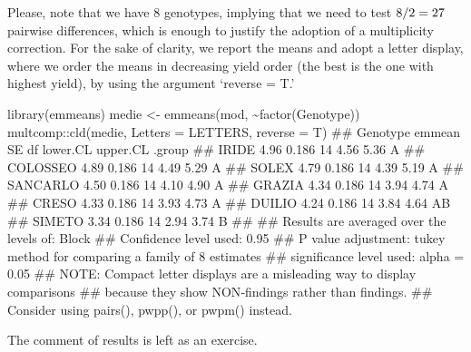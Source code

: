 \documentclass[a4paper,12pt,oneside]{book}
\newenvironment{Shaded}{\begin{snugshade}}{\end{snugshade}}
\newcommand{\SpecialCharTok}[1]{#1}
\newcommand{\DocumentationTok}[1]{#1}
\newcommand{\OtherTok}[1]{#1}
\newcommand{\FunctionTok}[1]{#1}
\newcommand{\AttributeTok}[1]{#1}
\newcommand{\AlertTok}[1]{#1}
\newcommand{\NormalTok}[1]{#1}
\begin{document}
Please, note that we have 8 genotypes, implying that we need to test \(8 \time 7 / 2 = 27\) pairwise differences, which is enough to justify the adoption of a multiplicity correction. For the sake of clarity, we report the means and adopt a letter display, where we order the means in decreasing yield order (the best is the one with highest yield), by using the argument `reverse = T.'

\scriptsize

\begin{Shaded}
\begin{Highlighting}[]
\FunctionTok{library}\NormalTok{(emmeans)}
\NormalTok{medie }\OtherTok{\textless{}{-}} \FunctionTok{emmeans}\NormalTok{(mod, }\SpecialCharTok{\textasciitilde{}}\FunctionTok{factor}\NormalTok{(Genotype))}
\NormalTok{multcomp}\SpecialCharTok{::}\FunctionTok{cld}\NormalTok{(medie, }\AttributeTok{Letters =}\NormalTok{ LETTERS, }\AttributeTok{reverse =}\NormalTok{ T)}
\DocumentationTok{\#\#  Genotype emmean    SE df lower.CL upper.CL .group}
\DocumentationTok{\#\#  IRIDE      4.96 0.186 14     4.56     5.36  A    }
\DocumentationTok{\#\#  COLOSSEO   4.89 0.186 14     4.49     5.29  A    }
\DocumentationTok{\#\#  SOLEX      4.79 0.186 14     4.39     5.19  A    }
\DocumentationTok{\#\#  SANCARLO   4.50 0.186 14     4.10     4.90  A    }
\DocumentationTok{\#\#  GRAZIA     4.34 0.186 14     3.94     4.74  A    }
\DocumentationTok{\#\#  CRESO      4.33 0.186 14     3.93     4.73  A    }
\DocumentationTok{\#\#  DUILIO     4.24 0.186 14     3.84     4.64  AB   }
\DocumentationTok{\#\#  SIMETO     3.34 0.186 14     2.94     3.74   B   }
\DocumentationTok{\#\# }
\DocumentationTok{\#\# Results are averaged over the levels of: Block }
\DocumentationTok{\#\# Confidence level used: 0.95 }
\DocumentationTok{\#\# P value adjustment: tukey method for comparing a family of 8 estimates }
\DocumentationTok{\#\# significance level used: alpha = 0.05 }
\DocumentationTok{\#\# }\AlertTok{NOTE}\DocumentationTok{: Compact letter displays are a misleading way to display comparisons}
\DocumentationTok{\#\#       because they show NON{-}findings rather than findings.}
\DocumentationTok{\#\#       Consider using \textquotesingle{}pairs()\textquotesingle{}, \textquotesingle{}pwpp()\textquotesingle{}, or \textquotesingle{}pwpm()\textquotesingle{} instead.}
\end{Highlighting}
\end{Shaded}

\normalsize

The comment of results is left as an exercise.
\end{document}
